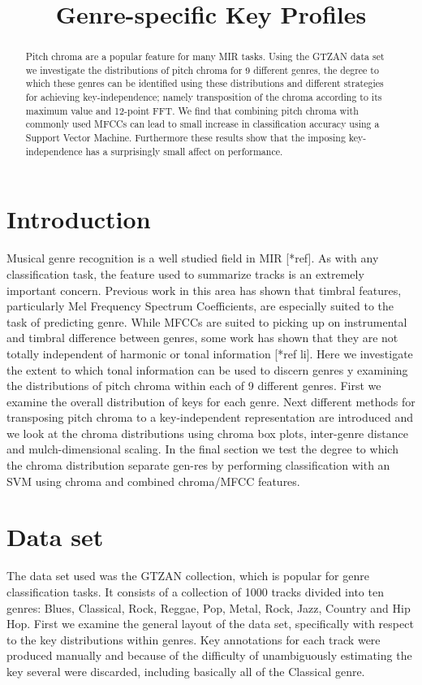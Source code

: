 \documentclass{article}
\title{Genre-specific Key Profiles}
\begin{document}
%
\maketitle
%
\begin{abstract}
Pitch chroma are a popular feature for many MIR tasks. Using the GTZAN data set we investigate the distributions of pitch chroma for 9 different genres, the degree to
which these genres can be identified using these distributions and different strategies for achieving key-independence; namely transposition of the chroma according to its maximum value and 12-point FFT. We find that combining pitch chroma with commonly used MFCCs can lead to small increase in classification accuracy using a Support Vector Machine. Furthermore these results show that the imposing key-independence has a surprisingly small affect on performance.
\end{abstract}
%
\section{Introduction}\label{sec:introduction}
Musical genre recognition is a well studied field in MIR [*ref]. As with any classification task, the feature used to summarize tracks is an extremely important concern. Previous work in this area has shown that timbral features, particularly Mel Frequency Spectrum Coefficients, are especially suited to the task of predicting genre. While MFCCs are suited to picking up on instrumental and timbral difference between genres, some work has shown that they are not totally independent of harmonic or tonal information [*ref li]. Here we investigate the extent to which tonal information can be used to discern genres y examining the distributions of pitch chroma within each of 9 different genres. First we examine the overall distribution of keys for each genre. Next different methods for transposing pitch chroma to a key-independent representation are introduced and we look at the chroma distributions using chroma box plots, inter-genre distance and mulch-dimensional scaling. In the final section we test the degree to which the chroma distribution separate gen-res by performing classification with an SVM using chroma and combined chroma/MFCC features.

\section{Data set}\label{sec:dataset}
The data set used was the GTZAN collection, which is popular for genre classification tasks. It consists of a collection of 1000 tracks divided into ten genres: Blues, Classical, Rock, Reggae, Pop, Metal, Rock, Jazz, Country and Hip Hop. First we examine the general layout of the data set, specifically with respect to the key distributions within genres. Key annotations for each track were produced manually and because of the difficulty of unambiguously estimating the key several were discarded, including basically all of the Classical genre.
\end{document}
